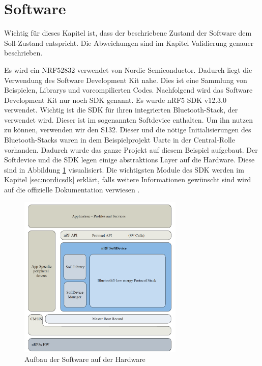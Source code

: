 \section{Software}\label{sec:software}
Wichtig für dieses Kapitel ist, dass der beschriebene Zustand der Software dem Soll-Zustand entspricht. Die Abweichungen sind im Kapitel Validierung genauer beschrieben.

Es wird ein NRF52832 verwendet von Nordic Semiconductor. Dadurch liegt die Verwendung des Software Development Kit \cite{nordic_sdk} nahe. Dies ist eine Sammlung von Beispielen, Librarys und vorcompilierten Codes. Nachfolgend wird das Software Development Kit nur noch SDK genannt. Es wurde nRF5 SDK v12.3.0 verwendet. Wichtig ist die SDK für ihren integrierten Bluetooth-Stack, der verwendet wird. Dieser ist im sogenannten Softdevice enthalten. Um ihn nutzen zu können, verwenden wir den S132. Dieser und die nötige Initialisierungen des Bluetooth-Stacks waren in dem Beispielprojekt Uartc in der Central-Rolle vorhanden. Dadurch wurde das ganze Projekt auf diesem Beispiel aufgebaut. Der Softdevice und die SDK legen einige abstraktions Layer auf die Hardware. Diese sind in Abbildung \ref{fig:Software_Layers} visualisiert. Die wichtigsten Module des SDK werden im Kapitel \ref{sec:nordicsdk} erklärt, falls weitere Informationen gewünscht sind wird auf die offizielle Dokumentation verwiesen \cite{nordic_info}.

\begin{figure}[htbp!!!!]
	\centering
	\includegraphics[width=0.7\textwidth]{Data/Software_Layers.PNG}
	\caption[Software:Layers]{Aufbau der Software auf der Hardware}
	\label{fig:Software_Layers}
\end{figure} 

